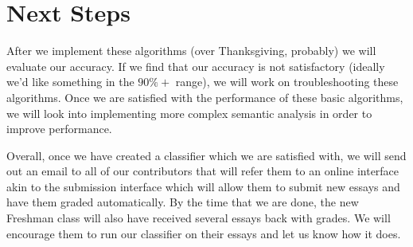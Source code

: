 \documentclass[11pt,twocolumn]{scrartcl}
\begin{document}
\section{Next Steps}
After we implement these algorithms (over Thanksgiving, probably) we will evaluate our accuracy. If we find that our accuracy is not satisfactory (ideally we'd like something in the $90\%+$ range), we will work on troubleshooting these algorithms. Once we are satisfied with the performance of these basic algorithms, we will look into implementing more complex semantic analysis in order to improve performance.

Overall, once we have created a classifier which we are satisfied with, we will send out an email to all of our contributors that will refer them to an online interface akin to the submission interface which will allow them to submit new essays and have them graded automatically. By the time that we are done, the new Freshman class will also have received several essays back with grades. We will encourage them to run our classifier on their essays and let us know how it does.
    
\end{document}
